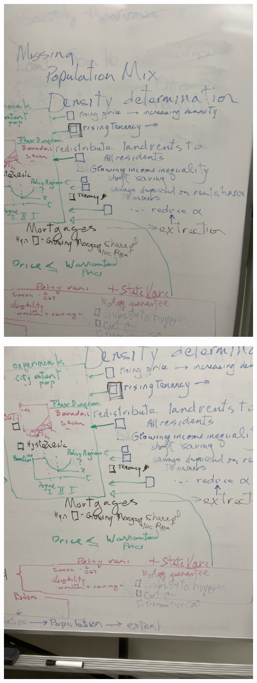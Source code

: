 \documentclass[12pt]{article}
\begin{document}
\includegraphics[scale=.5, angle=-90]{IMG_2688.jpg}

\includegraphics[scale=.5, angle=-90]{IMG_2689.jpg}
\end{document}

